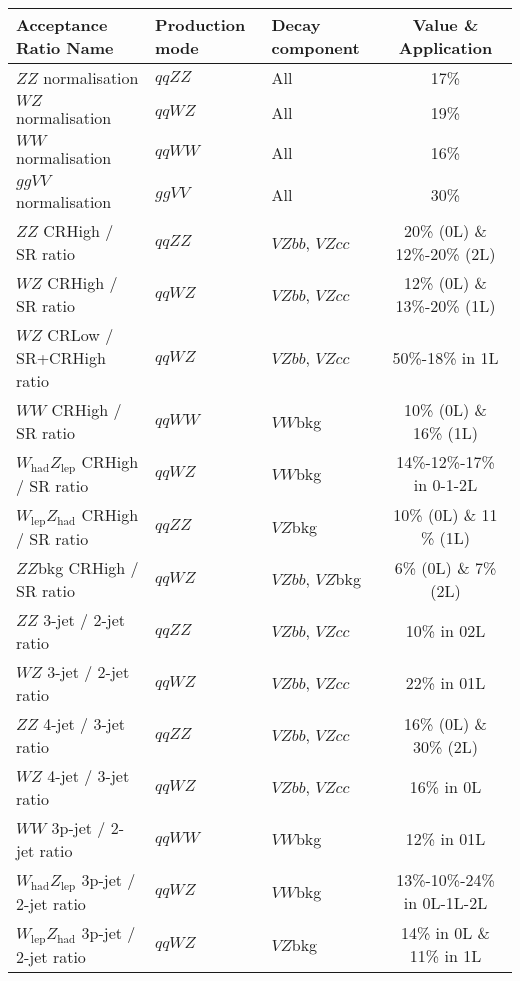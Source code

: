 \begin{table}[h!]
    \hspace{-1cm}
    \resizebox{1.1\textwidth}{!}
    {
     \begin{tabular}{ l l | l | c } 
     \hline \hline
     \textbf{Acceptance Ratio Name} & \textbf{Production mode} &  \textbf{Decay component} & \textbf{Value \& Application} \\
     \hline 
     $ZZ$ normalisation & $qqZZ$ & All & 17\%   \\ 
     $WZ$ normalisation & $qqWZ$ & All & 19\%   \\ 
     $WW$ normalisation & $qqWW$ & All & 16\%   \\ 
     $ggVV$ normalisation & $ggVV$ & All & 30\% \\ 
     \hline
     $ZZ$ CRHigh / SR ratio & $qqZZ$ & $VZbb$, $VZcc$ & 20\% (0L) \& 12\%-20\% (2L)     \\ 
     $WZ$ CRHigh / SR ratio & $qqWZ$ & $VZbb$, $VZcc$ & 12\% (0L) \& 13\%-20\% (1L)     \\ 
     $WZ$ CRLow / SR+CRHigh ratio & $qqWZ$ & $VZbb$, $VZcc$ & 50\%-18\% in 1L  \\ 
     $WW$ CRHigh / SR ratio & $qqWW$ & $VW$bkg & 10\% (0L) \& 16\% (1L)        \\ 
     $W_{\text{had}}Z_{\text{lep}}$ CRHigh / SR ratio & $qqWZ$ & $VW$bkg & 14\%-12\%-17\% in 0-1-2L   \\ 
     $W_{\text{lep}}Z_{\text{had}}$ CRHigh / SR ratio & $qqZZ$ & $VZ$bkg & 10\% (0L) \& 11 \% (1L) \\ 
     $ZZ$bkg CRHigh / SR ratio & $qqWZ$ & $VZbb$, $VZ$bkg & 6\% (0L) \& 7\% (2L) \\ 
     \hline
     $ZZ$ 3-jet / 2-jet ratio & $qqZZ$ & $VZbb$, $VZcc$ & 10\% in 02L \\ 
     $WZ$ 3-jet / 2-jet ratio & $qqWZ$ & $VZbb$, $VZcc$ & 22\% in 01L \\ 
     $ZZ$ 4-jet / 3-jet ratio & $qqZZ$ & $VZbb$, $VZcc$ & 16\% (0L) \& 30\% (2L) \\ 
     $WZ$ 4-jet / 3-jet ratio & $qqWZ$ & $VZbb$, $VZcc$ & 16\% in 0L \\ 
     $WW$ 3p-jet / 2-jet ratio & $qqWW$ & $VW$bkg & 12\% in 01L \\ 
     $W_{\text{had}}Z_{\text{lep}}$ 3p-jet / 2-jet ratio & $qqWZ$ & $VW$bkg & 13\%-10\%-24\% in 0L-1L-2L  \\  
     $W_{\text{lep}}Z_{\text{had}}$ 3p-jet / 2-jet ratio & $qqWZ$ & $VZ$bkg & 14\% in 0L \& 11\% in 1L \\ 

\end{tabular}}
\end{table}
